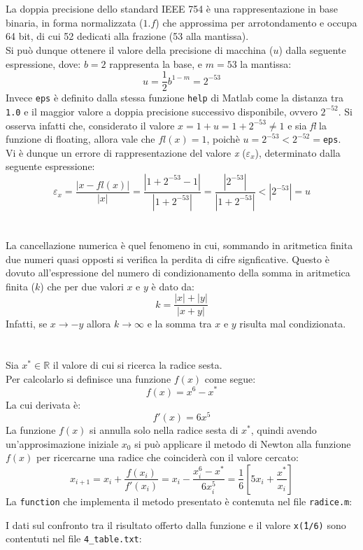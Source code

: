 \documentclass[10pt,a4paper]{article}
\begin{document}
\section{}
La doppia precisione dello standard IEEE 754 è una rappresentazione in base binaria, in forma normalizzata ($1.f$) che approssima per arrotondamento e occupa 64 bit, di cui 52 dedicati alla frazione (53 alla mantissa).\\Si può dunque ottenere il valore della precisione di macchina ($u$) dalla seguente espressione, dove: $b=2$ rappresenta la base, e $m=53$ la mantissa:$$u = \frac{1}{2}b^{1-m} = 2^{-53}$$
Invece \texttt{eps} è definito dalla stessa funzione \texttt{help} di Matlab come 	la distanza tra \texttt{1.0} e il maggior valore a doppia precisione successivo disponibile, ovvero $ 2^{-52} $.
Si osserva infatti che, considerato il valore $x = 1+u = 1+2^{-53}\neq 1 $ e sia \textit{fl} la funzione di floating, allora vale che $fl(x)=1 $, poichè $u=2^{-53}<2^{-52}=$\texttt{eps}.\\Vi è dunque un errore di rappresentazione del valore \textit{x} ($\varepsilon_x$), determinato dalla seguente espressione:$$\varepsilon_x=\frac{|x-fl(x)|}{|x|}=\frac{|1+2^{-53}-1|}{|1+2^{-53}|}=\frac{|2^{-53}|}{|1+2^{-53}|}<|2^{-53}|=u$$
\section{}La cancellazione numerica è quel fenomeno in cui, sommando in aritmetica finita due numeri quasi opposti si verifica la perdita di cifre signficative. Questo è dovuto all'espressione del numero di condizionamento della somma in aritmetica finita ($k$) che per due valori $x$ e $y$ è dato da:$$k = \frac{|x|+|y|}{|x+y|}$$Infatti, se $x\rightarrow-y$ allora $k\rightarrow\infty$ e la somma tra $x$ e $y$ risulta mal condizionata.
\section{}
Sia $x^*\in\mathbb{R}$ il valore di cui si ricerca la radice sesta.\\
Per calcolarlo si definisce una funzione $f(x)$ come segue:
$$f(x) = x^6-x^*$$La cui derivata è:$$f'(x)=6x^5$$La funzione $f(x)$ si annulla solo nella radice sesta di $x^*$, quindi avendo un'approsimazione iniziale $x_0$ si può applicare il metodo di Newton alla funzione $f(x)$ per ricercarne una radice che coinciderà con il valore cercato:
$$x_{i+1}=x_i+\frac{f(x_i)}{f'(x_i)}=x_i-\frac{x_i^6-x^*}{6x_i^5}=\frac{1}{6}\left[5x_i+\frac{x^*}{x_i}\right]$$
La \texttt{function} che implementa il metodo presentato è contenuta nel file \texttt{radice.m}:

\pagebreak
I dati sul confronto tra il  risultato offerto dalla funzione e il valore \texttt{x\^ (1/6)} sono contentuti nel file \texttt{4\_table.txt}:

\end{document}
